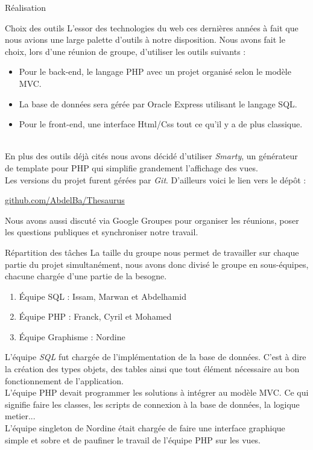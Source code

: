 \documentclass[a4paper, 12pt]{report}
\begin{document}
\begin{chapter}{Réalisation}
	\begin{section}{Choix des outils}
	L'essor des technologies du web ces dernières années à fait que nous avions une large palette d'outils à notre disposition. Nous avons fait le choix,
	lors d'une réunion de groupe, d'utiliser les outils suivants :
	\begin{itemize}
		\item Pour le back-end, le langage PHP avec un projet organisé selon le modèle MVC.
		\item La base de données sera gérée par Oracle Express utilisant le langage SQL.
		\item Pour le front-end, une interface Html/Css tout ce qu'il y a de plus classique.
	\end{itemize}~\\
	En plus des outils déjà cités nous avons décidé d'utiliser \emph{Smarty}, un générateur de template pour PHP qui simplifie grandement l'affichage des vues.\\
	Les versions du projet furent gérées par \emph{Git}. D'ailleurs voici le lien vers le dépôt :

	\begin{center} \url{github.com/AbdelBa/Thesaurus}\end{center}

	Nous avons aussi discuté via Google Groupes pour organiser les réunions, poser les questions publiques et synchroniser notre travail.
	\end{section}

	\begin{section}{Répartition des tâches}
		La taille du groupe nous permet de travailler sur chaque partie du projet simultanément, nous avons donc divisé le groupe en sous-équipes,
		chacune chargée d'une partie de la besogne.
		\begin{enumerate}
			\item{Équipe SQL} : Issam, Marwan et Abdelhamid
			\item{Équipe PHP} : Franck, Cyril et Mohamed
			\item{Équipe Graphisme} : Nordine
		\end{enumerate}

		L'équipe \emph{SQL} fut chargée de l'implémentation de la base de données. C'est à dire la création des types objets, des tables ainsi 
		que tout élément nécessaire au bon fonctionnement de l'application.\\
		L'équipe PHP devait programmer les solutions à intégrer au modèle MVC. Ce qui signifie faire les classes, les scripts de connexion à la 
		base de données, la logique metier...\\
		L'équipe singleton de Nordine était chargée de faire une interface graphique simple et sobre et de paufiner le travail de l'équipe PHP
		sur les vues.
	\end{section}


\end{chapter}
\end{document}
